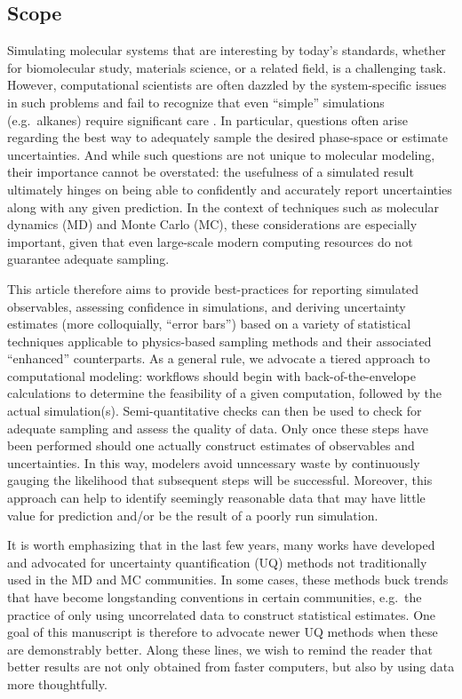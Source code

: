 \subsection{Scope}

Simulating molecular systems that are interesting by today's standards, whether for biomolecular study, materials science, or a related field, is a challenging task.
However, computational scientists are often dazzled by the system-specific issues in such problems and fail to recognize that even ``simple'' simulations (e.g.\ alkanes) require significant care \cite{Schappals2017}.  In particular, questions often arise regarding the best way to adequately sample the desired phase-space or estimate uncertainties.  And while such questions are not unique to molecular modeling, their importance cannot be overstated: the usefulness of a simulated result ultimately hinges on being able to confidently and accurately report uncertainties along with any given prediction.  In the context of techniques such as molecular dynamics (MD) and Monte Carlo (MC), these considerations are especially important, given that even large-scale modern computing resources do not guarantee adequate sampling.

This article therefore aims to provide best-practices for reporting simulated observables, assessing confidence in simulations, and deriving uncertainty estimates (more colloquially, ``error bars'') based on a variety of statistical techniques applicable to physics-based sampling methods and their associated ``enhanced'' counterparts.  As a general rule, we advocate a tiered approach to computational modeling: workflows should begin with back-of-the-envelope calculations to determine the feasibility of a given computation, followed by the actual simulation(s).  Semi-quantitative checks can then be used to check for adequate sampling and assess the quality of data.  Only once these steps have been performed should one actually construct estimates of observables and uncertainties.  In this way, modelers avoid unncessary waste by continuously gauging the likelihood that subsequent steps will be successful.  Moreover, this approach can help to identify seemingly reasonable data that may have little value for prediction and/or be the result of a poorly run simulation.

It is worth emphasizing that in the last few years, many works have developed and advocated for uncertainty quantification (UQ) methods not traditionally used in the MD and MC communities.  In some cases, these methods buck trends that have become longstanding conventions in certain communities, e.g.\ the practice of only using uncorrelated data to construct statistical estimates.  One goal of this manuscript is therefore to advocate newer UQ methods when these are demonstrably better.  Along these lines, we wish to remind the reader that better results are not only obtained from faster computers, but also by using data more thoughtfully.  


